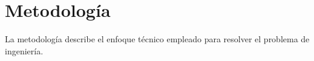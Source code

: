 \section{Metodología}

La metodología describe el enfoque técnico empleado para resolver el problema de ingeniería.